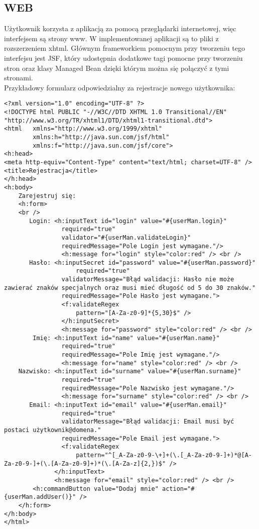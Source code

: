 \subsection{WEB}
Użytkownik korzysta z aplikacją za pomocą przeglądarki internetowej, więc interfejsem są strony www. W implementowanej aplikacji są to pliki z rozszerzeniem xhtml. Głównym frameworkiem pomocnym przy tworzeniu tego interfejsu jest JSF, który udostępnia dodatkowe tagi pomocne przy tworzeniu stron oraz klasy Managed Bean dzięki którym można się połączyć z tymi stronami.\\
Przykładowy formularz odpowiedzialny za rejestracje nowego użytkownika:
\begin{lstlisting}[breaklines=true]
<?xml version="1.0" encoding="UTF-8" ?>
<!DOCTYPE html PUBLIC "-//W3C//DTD XHTML 1.0 Transitional//EN" "http://www.w3.org/TR/xhtml1/DTD/xhtml1-transitional.dtd">
<html 	xmlns="http://www.w3.org/1999/xhtml" 
		xmlns:h="http://java.sun.com/jsf/html"
		xmlns:f="http://java.sun.com/jsf/core"> 
<h:head>
<meta http-equiv="Content-Type" content="text/html; charset=UTF-8" />
<title>Rejestracja</title>
</h:head> 
<h:body>  
	Zarejestruj się: 
	<h:form>
	<br />
	   Login: <h:inputText id="login" value="#{userMan.login}" 
	   			required="true"
	   			validator="#{userMan.validateLogin}"
	   			requiredMessage="Pole Login jest wymagane."/> 
	   			<h:message for="login" style="color:red" /> <br />
	   Hasło: <h:inputSecret id="password" value="#{userMan.password}" 
					required="true" 
	   			validatorMessage="Błąd walidacji: Hasło nie może zawierać znaków specjalnych oraz musi mieć długość od 5 do 30 znaków."
	   			requiredMessage="Pole Hasło jest wymagane.">  
	   			<f:validateRegex
					pattern="[A-Za-z0-9]*{5,30}$" />
			    </h:inputSecret>
			    <h:message for="password" style="color:red" /> <br />
		Imię: <h:inputText id="name" value="#{userMan.name}" 
				required="true"  
				requiredMessage="Pole Imię jest wymagane."/> 
				<h:message for="name" style="color:red" /> <br />
	Nazwisko: <h:inputText id="surname" value="#{userMan.surname}" 
				required="true" 
				requiredMessage="Pole Nazwisko jest wymagane."/> 
				<h:message for="surname" style="color:red" /> <br />
	   Email: <h:inputText id="email" value="#{userMan.email}" 
				required="true" 
				validatorMessage="Błąd walidacji: Email musi być postaci użytkownik@domena."
				requiredMessage="Pole Email jest wymagane."> 
				<f:validateRegex
					pattern="^[_A-Za-z0-9-\+]+(\.[_A-Za-z0-9-]+)*@[A-Za-z0-9-]+(\.[A-Za-z0-9]+)*(\.[A-Za-z]{2,})$" />
			  </h:inputText>
			  <h:message for="email" style="color:red" /> <br />
		<h:commandButton value="Dodaj mnie" action="#{userMan.addUser()}" />
	</h:form>
</h:body>
</html>
\end{lstlisting}
